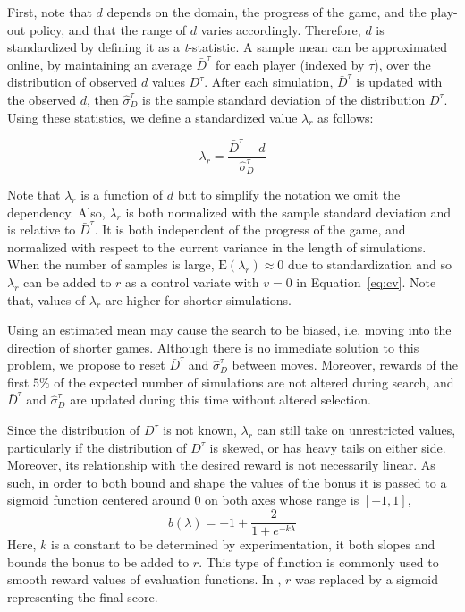 \documentclass{ecai2014}
\newcommand{\E}[1]{\mathrm{E}\left( #1 \right)}
\begin{document}
First, note that $d$ depends on the domain, the progress of the game, and the play-out policy, and that the range of $d$ varies accordingly. Therefore, $d$ is standardized by defining it as a \emph{t}-statistic. A sample mean can be approximated online, by maintaining an average $\bar{D}^\tau$ for each player (indexed by $\tau$), over the distribution of observed $d$ values $D^\tau$. After each simulation, $\bar{D}^\tau$ is updated with the observed $d$, then $\hat{\sigma}^\tau_D$ is the sample standard deviation of the distribution $D^\tau$. Using these statistics, we define a standardized value $\lambda_r$ as follows:

\begin{equation}
\lambda_r = \frac{\bar{D}^\tau - d}{\hat{\sigma}^\tau_D}
\label{eq:rb_norm}
\end{equation}

Note that $\lambda_r$ is a function of $d$ but to simplify the notation we omit the dependency. 
Also, $\lambda_r$ is both normalized with the sample standard deviation and is relative to $\bar{D}^\tau$. It is both independent of the progress of the game, and normalized with respect to the current variance in the length of simulations. When the number of samples is large, $\E{\lambda_r} \approx 0$ due to standardization and so $\lambda_r$ can be added to $r$ as a control variate with $v = 0$ in Equation~\ref{eq:cv}. Note that, values of $\lambda_r$ are higher for shorter simulations.

Using an estimated mean may cause the search to be biased, i.e. moving into the direction of shorter games. Although there is no immediate solution to this problem, we propose to reset $\bar{D}^\tau$ and $\hat{\sigma}^\tau_D$ between moves. Moreover, rewards of the first $5\%$ of the expected number of simulations are not altered during search, and $\bar{D}^\tau$ and $\hat{\sigma}^\tau_D$ are updated during this time without altered selection.

Since the distribution of $D^\tau$ is not known, $\lambda_r$ can still take on unrestricted values, particularly if the distribution of $D^\tau$ is skewed, or has heavy tails on either side. Moreover, its relationship with the desired reward is not necessarily linear. As such, in order to both bound and shape the values of the bonus it is passed to a sigmoid function centered around $0$ on both axes whose range is $[-1,1]$,
\begin{equation}
b(\lambda)=-1+\frac{2}{1+e^{-k\lambda}}
\label{eq:sigmoid}
\end{equation}
Here, $k$ is a constant to be determined by experimentation, it both slopes and bounds the bonus to be added to $r$. This type of function is commonly used to smooth reward values of evaluation functions. In \cite{shibahara2008combining}, $r$ was replaced by a sigmoid representing the final score.
\end{document}
